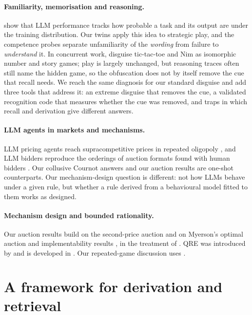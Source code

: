 \documentclass[10pt]{article}
\theoremstyle{definition}
\theoremstyle{remark}
\begin{document}
\paragraph{Familiarity, memorisation and reasoning.} \citet{mccoy2024embers} show that LLM
performance tracks how probable a task and its output are under the training distribution. Our
twins apply this idea to strategic play, and the competence probes separate unfamiliarity of the
\emph{wording} from failure to \emph{understand} it. In concurrent work, \citet{rada2026experience}
disguise tic-tac-toe and Nim as isomorphic number and story games; play is largely unchanged,
but reasoning traces often still name the hidden game, so the obfuscation does not by itself
remove the cue that recall needs. We reach the same diagnosis for our standard disguise and
add three tools that address it: an extreme disguise that removes the cue, a validated
recognition code that measures whether the cue was removed, and traps in which recall and
derivation give different answers.

\paragraph{LLM agents in markets and mechanisms.} LLM pricing agents reach supracompetitive
prices in repeated oligopoly \citep{fish2024collusion}, and LLM bidders reproduce the
orderings of auction formats found with human bidders \citep{shah2025bidders}. Our collusive
Cournot answers and our auction results are one-shot counterparts. Our mechanism-design question
is different: not how LLMs behave under a given rule, but whether a rule derived from a
behavioural model fitted to them works as designed.

\paragraph{Mechanism design and bounded rationality.} Our auction results build on the
second-price auction \citep{vickrey1961} and on Myerson's optimal auction and implementability
results \citep{myerson1981}, in the treatment of \citet{roughgarden2016}. QRE was introduced by
\citet{mckelvey1995qre} and is developed in \citet{goeree2016qre}. Our repeated-game discussion
uses \citet{benoit1985finitely}.

\section{A framework for derivation and retrieval}\label{sec:framework}
\end{document}
